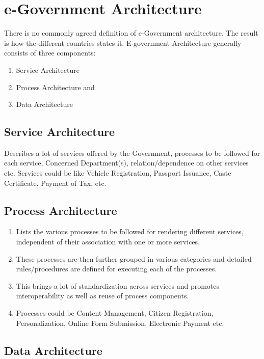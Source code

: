 \section{e-Government Architecture}
There is no commonly agreed definition of e-Government architecture. The result is how the different countries states it. E-government Architecture generally consists of three components: 
\begin{multicols}{2}
	\begin{enumerate}
		\item Service Architecture
		\item Process Architecture and 
		\item Data Architecture
	\end{enumerate}
\end{multicols}


\subsection{Service Architecture}
Describes a lot of services offered by the Government, processes to be followed for each service, Concerned Department(s), relation/dependence on other services etc. Services could be like Vehicle Registration, Passport Issuance, Caste Certificate, Payment of Tax, etc.

 \subsection{Process Architecture}
 
 \begin{enumerate}[label=(\roman*)]
 	\item Lists the various processes to be followed for rendering different services, independent of their association with one or more services. 
 	\item These processes are then further grouped in various categories and detailed rules/procedures are defined for executing each of the processes. 
 	\item This brings a lot of standardization across services and promotes interoperability as well as reuse of process components. 
 	\item Processes could be Content Management, Citizen Registration, Personalization, Online Form Submission, Electronic Payment etc.
	 \end{enumerate}

\subsection{Data Architecture}

